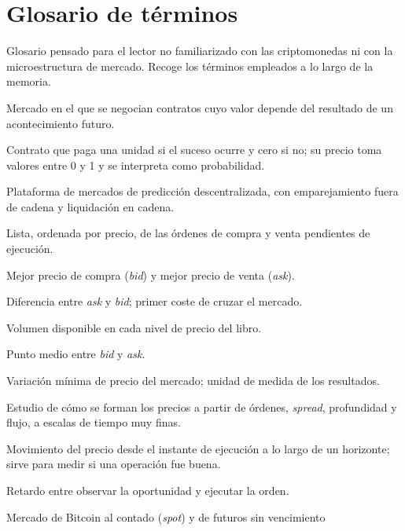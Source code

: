 \section*{Glosario de términos}
\label{sec::glosario}

Glosario pensado para el lector no familiarizado con las criptomonedas ni con la
microestructura de mercado. Recoge los términos empleados a lo largo de la memoria.

\begin{description}[align=left, leftmargin=3.2cm, labelwidth=3cm, font=\bfseries]
\item[Mercado de predicción] Mercado en el que se negocian contratos cuyo valor depende del
resultado de un acontecimiento futuro.
\item[Contrato binario] Contrato que paga una unidad si el suceso ocurre y cero si no; su
precio toma valores entre 0 y 1 y se interpreta como probabilidad.
\item[Polymarket] Plataforma de mercados de predicción descentralizada, con emparejamiento
fuera de cadena y liquidación en cadena.
\item[Libro de órdenes (LOB)] Lista, ordenada por precio, de las órdenes de compra y venta
pendientes de ejecución.
\item[Bid / Ask] Mejor precio de compra (\emph{bid}) y mejor precio de venta (\emph{ask}).
\item[Spread] Diferencia entre \emph{ask} y \emph{bid}; primer coste de cruzar el mercado.
\item[Profundidad] Volumen disponible en cada nivel de precio del libro.
\item[Precio medio (\emph{mid})] Punto medio entre \emph{bid} y \emph{ask}.
\item[Tick] Variación mínima de precio del mercado; unidad de medida de los resultados.
\item[Microestructura] Estudio de cómo se forman los precios a partir de órdenes, \emph{spread},
profundidad y flujo, a escalas de tiempo muy finas.
\item[Markout] Movimiento del precio desde el instante de ejecución a lo largo de un horizonte;
sirve para medir si una operación fue buena.
\item[Latencia] Retardo entre observar la oportunidad y ejecutar la orden.
\item[Spot / Perpetuo] Mercado de Bitcoin al contado (\emph{spot}) y de futuros sin vencimiento

\end{description}
